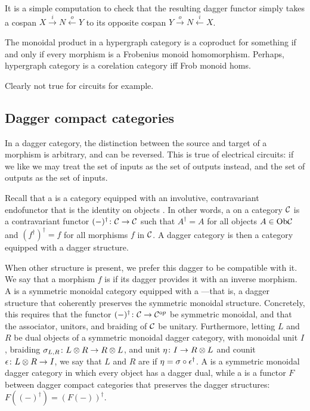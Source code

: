\begin{example}
  It is a simple computation to check that the resulting dagger functor simply
  takes a cospan $X \stackrel{i}{\longrightarrow} N \stackrel{o}{\longleftarrow}
  Y$ to its opposite cospan $Y \stackrel{o}{\longrightarrow} N
  \stackrel{i}{\longleftarrow} X$.
\end{example}

\begin{proposition}
  The monoidal product in a hypergraph category is a coproduct for something if and only if
  every morphism is a Frobenius monoid homomorphism. Perhaps, hypergraph
  category is a corelation category iff Frob monoid homs.
\end{proposition}

Clearly not true for circuits for example.

\subsection{Dagger compact categories} \label{subsec:dagger}

In a dagger category, the distinction between the source and target of a morphism is arbitrary, and can be reversed. This is true of electrical circuits: if we like we may treat the set of inputs as the set of outputs instead, and the set of outputs as the set of inputs.

Recall that a  is a category equipped with an
involutive, contravariant endofunctor that is the identity on objects
\cite{AC,Se}. In other words, a  on a category $\mathcal C$
is a contravariant functor $(-)^\dagger{\colon} \mathcal C \to \mathcal C$ such that
$A^\dagger = A$ for all objects $A \in \mathrm{Ob} \mathcal C$ and $(f^\dagger)^\dagger = f$
for all morphisms $f$ in $\mathcal C$.  A dagger category is then a category equipped
with a dagger structure.

When other structure is present, we prefer this dagger to be compatible with it.
We say that a morphism $f$ is  if its dagger provides it with an
inverse morphism. A  is a symmetric
monoidal category equipped with a ---that is, a dagger structure that coherently preserves the symmetric
monoidal structure. Concretely, this requires that the functor $(-)^\dagger{\colon}
\mathcal C \to \mathcal C^{\mathrm op}$ be symmetric monoidal, and that the associator,
unitors, and braiding of $\mathcal C$ be unitary. Furthermore, letting $L$ and $R$ be
dual objects of a symmetric monoidal dagger category, with monoidal unit $I$,
braiding $\sigma_{L,R}{\colon} L \otimes R \to R \otimes L$, and unit $\eta{\colon} I \to R
\otimes L$ and counit $\epsilon{\colon} L \otimes R \to I$, we say that $L$ and $R$ are
 if $\eta = \sigma \circ \epsilon^\dagger$.  A  is a symmetric monoidal dagger category in which every object
has a dagger dual, while a  is a functor $F$ between
dagger compact categories that preserves the dagger structures: $F((-)^\dagger)
= (F(-))^\dagger$.

